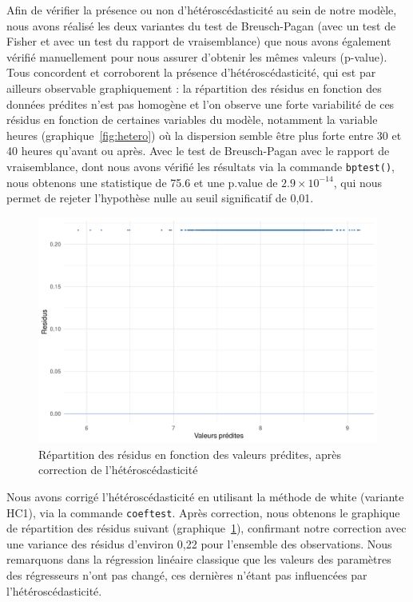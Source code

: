 \documentclass[a4paper, french, 11 pt]{article}\usepackage[]{graphicx}\usepackage[]{xcolor}
\begin{document}
Afin de vérifier la présence ou non d’hétéroscédasticité au sein de notre modèle, nous avons réalisé les deux variantes du test de Breusch-Pagan (avec un test de Fisher et avec un test du rapport de vraisemblance) que nous avons également vérifié manuellement pour nous assurer d’obtenir les mêmes valeurs (p-value). Tous concordent et corroborent la présence d’hétéroscédasticité, qui est par ailleurs observable graphiquement : la répartition des résidus en fonction des données prédites n’est pas homogène et l’on observe une forte variabilité de ces résidus en fonction de certaines variables du modèle, notamment la variable heures (graphique~\ref{fig:hetero}) où la dispersion semble être plus forte entre 30 et 40 heures qu’avant ou après. Avec le test de Breusch-Pagan avec le rapport de vraisemblance, dont nous avons vérifié les résultats via la commande \verb+bptest()+, nous obtenons une statistique de 75.6 et une p.value de \ensuremath{2.9\times 10^{-14}}, qui nous permet de rejeter l’hypothèse nulle au seuil significatif de 0,01. 





\begin{figure}[h!]
\center
\includegraphics[width=0.7\linewidth]{figure/hetero_correct.pdf}
\caption{Répartition des résidus en fonction des valeurs prédites, après correction de l'hétéroscédasticité\label{fig:hetero_correct}}
\end{figure}

Nous avons corrigé l'hétéroscédasticité en utilisant la méthode de white (variante HC1), via la commande \verb+coeftest+. Après correction, nous obtenons le graphique de répartition des résidus suivant (graphique~\ref{fig:hetero_correct}), confirmant notre correction avec une variance des résidus d’environ 0,22 pour l’ensemble des observations. Nous remarquons dans la régression linéaire classique que les valeurs des paramètres des régresseurs n’ont pas changé, ces dernières n’étant pas influencées par l’hétéroscédasticité. 
\end{document}
